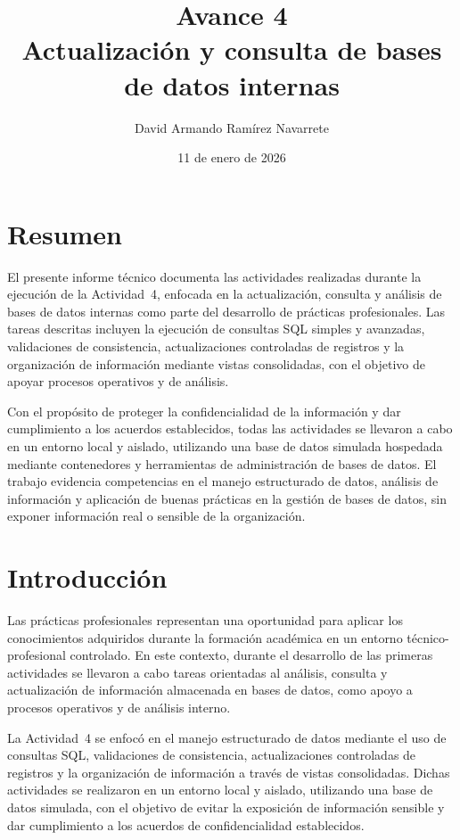 \documentclass[12pt]{article}
\title{Avance 4 \\ Actualización y consulta de bases de datos internas}
\author{David Armando Ramírez Navarrete}
\date{11 de enero de 2026}
\begin{document}
\maketitle

\section*{Resumen}
El presente informe técnico documenta las actividades realizadas durante la ejecución de la Actividad~4, enfocada en la actualización, consulta y análisis de bases de datos internas como parte del desarrollo de prácticas profesionales. Las tareas descritas incluyen la ejecución de consultas SQL simples y avanzadas, validaciones de consistencia, actualizaciones controladas de registros y la organización de información mediante vistas consolidadas, con el objetivo de apoyar procesos operativos y de análisis.

Con el propósito de proteger la confidencialidad de la información y dar cumplimiento a los acuerdos establecidos, todas las actividades se llevaron a cabo en un entorno local y aislado, utilizando una base de datos simulada hospedada mediante contenedores y herramientas de administración de bases de datos. El trabajo evidencia competencias en el manejo estructurado de datos, análisis de información y aplicación de buenas prácticas en la gestión de bases de datos, sin exponer información real o sensible de la organización.


\section*{Introducción}
Las prácticas profesionales representan una oportunidad para aplicar los conocimientos adquiridos durante la formación académica en un entorno técnico-profesional controlado. En este contexto, durante el desarrollo de las primeras actividades se llevaron a cabo tareas orientadas al análisis, consulta y actualización de información almacenada en bases de datos, como apoyo a procesos operativos y de análisis interno.

La Actividad~4 se enfocó en el manejo estructurado de datos mediante el uso de consultas SQL, validaciones de consistencia, actualizaciones controladas de registros y la organización de información a través de vistas consolidadas. Dichas actividades se realizaron en un entorno local y aislado, utilizando una base de datos simulada, con el objetivo de evitar la exposición de información sensible y dar cumplimiento a los acuerdos de confidencialidad establecidos.
\end{document}
